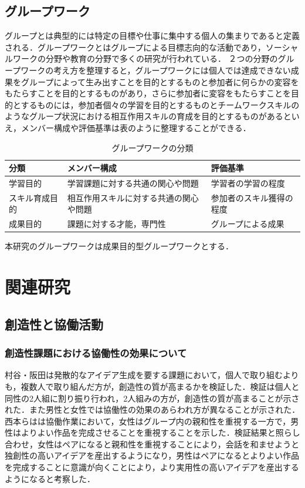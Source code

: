\documentclass{funthesis}
\begin{document}
\section{グループワーク}
グループとは典型的には特定の目標や仕事に集中する個人の集まりであると定義される．グループワークとはグループによる目標志向的な活動であり，ソーシャルワークの分野や教育の分野で多くの研究が行われている\cite{A13}．
２つの分野のグループワークの考え方を整理すると，グループワークには個人では達成できない成果をグループによって生み出すことを目的とするものと参加者に何らかの変容をもたらすことを目的とするものがあり，さらに参加者に変容をもたらすことを目的とするものには，参加者個々の学習を目的とするものとチームワークスキルのようなグループ状況における相互作用スキルの育成を目的とするものがあるといえ，メンバー構成や評価基準は表のように整理することができる．\cite{A13}
\begin{table}[h]
\begin{center}
  \begin{tabular}{lll} \hline
    分類& メンバー構成&評価基準\tabularnewline \hline
    学習目的& 学習課題に対する共通の関心や問題 & 
    学習者の学習の程度\tabularnewline
    スキル育成目的&相互作用スキルに対する共通の関心や問題& 
    参加者のスキル獲得の程度\tabularnewline
    成果目的&課題に対する才能，専門性&
    グループによる成果\tabularnewline
    \hline
  \end{tabular}
  \caption{グループワークの分類}
  \label{groupwork}
  \end{center}
\end{table}

本研究のグループワークは成果目的型グループワークとする．



\chapter{関連研究}

\section{創造性と協働活動}

\subsection{創造性課題における協働性の効果について} %
村谷・阪田\cite{A10}は発散的なアイデア生成を要する課題において，個人で取り組むよりも，複数人で取り組んだ方が，創造性の質が高まるかを検証した．検証は個人と同性の2人組に割り振り行われ，2人組みの方が，創造性の質が高まることが示された．また男性と女性では協働性の効果のあらわれ方が異なることが示された．西本らは\cite{A11}は協働作業において，女性はグループ内の親和性を重視する一方で，男性はよりよい作品を完成させることを重視することを示した．検証結果と照らし合わせ，女性はペアになると親和性を重視することにより，会話を和ませようと独創性の高いアイデアを産出するようになり，男性はペアになるとよりよい作品を完成することに意識が向くことにより，より実用性の高いアイデアを産出するようになると考察した．
\end{document}
